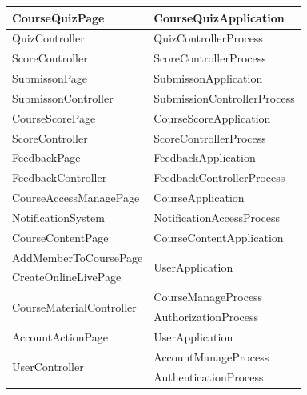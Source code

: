 \documentclass[./../main.tex]{subfiles}
\begin{document}
\begin{longtable}{|p{}|p{}|}
CourseQuizPage	&CourseQuizApplication \\ \hline
QuizController	&QuizControllerProcess \\ \hline
ScoreController	&ScoreControllerProcess \\ \hline
SubmissonPage	&SubmissonApplication \\ \hline
SubmissonController	&SubmissionControllerProcess \\ \hline
CourseScorePage	&CourseScoreApplication \\ \hline
ScoreController	&ScoreControllerProcess \\ \hline
FeedbackPage	&FeedbackApplication \\ \hline
FeedbackController	&FeedbackControllerProcess \\ \hline
CourseAccessManagePage	&CourseApplication \\ \hline
NotificationSystem	&NotificationAccessProcess \\ \hline
CourseContentPage	&CourseContentApplication \\ \hline
AddMemberToCoursePage	& \multirow{2}{*}{UserApplication} \\ 
CreateOnlineLivePage	&  \\ \hline
\multirow{2}{*}{CourseMaterialController}	&CourseManageProcess \\
	&AuthorizationProcess \\ \hline
AccountActionPage	&UserApplication \\ \hline
\multirow{2}{*}{UserController}	&AccountManageProcess \\
	&AuthenticationProcess \\ \hline
	\end{longtable}
\end{document}
